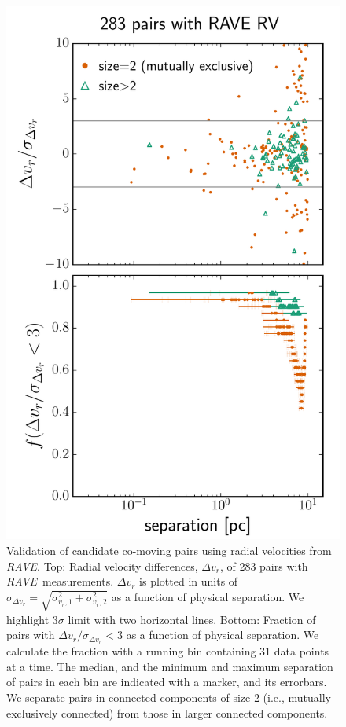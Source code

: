 \documentclass[manuscript, letterpaper]{aastex6}
\newcommand{\project}[1]{\textsl{#1}}
\newcommand{\acronym}[1]{{\small{#1}}}
\newcommand{\rave}{\project{\acronym{RAVE}}}
\begin{document}
\begin{figure}[htbp]
  \begin{center}
    \includegraphics[width=.5\linewidth]{figures/raverv.pdf}
  \end{center}
  \caption{%
    Validation of candidate co-moving pairs using radial velocities from \rave.
    Top: Radial velocity differences, $\Delta v_r$, of 283 pairs with \rave\ measurements.
    $\Delta v_r$ is plotted in units of $\sigma_{\Delta v_r} = \sqrt{\sigma_{v_r,1}^2 + \sigma_{v_r,2}^2}$
    as a function of physical separation.
    We highlight $3\sigma$ limit with two horizontal lines.
    Bottom: Fraction of pairs with $\Delta v_r/\sigma_{\Delta v_r} <3$
    as a function of physical separation. We calculate the fraction with a running
    bin containing 31 data points at a time.
    The median, and the minimum and maximum separation of pairs in each bin are
    indicated with a marker, and its errorbars.
    We separate pairs in connected components of size 2 (i.e., mutually exclusively connected)
    from those in larger connected components.
    \label{fig:raverv}}
\end{figure}
\end{document}
